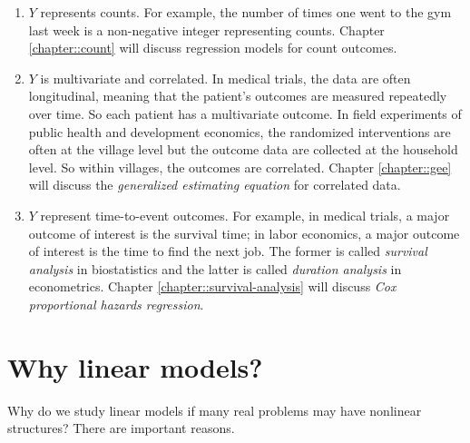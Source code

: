 \begin{enumerate}[label=(T\arabic*), ref=T\arabic*]
\item $Y$ represents counts. For example, the number of times one went to the gym last week is a non-negative integer representing counts. 
Chapter \ref{chapter::count} will discuss regression models for count outcomes. 




\item $Y$ is  multivariate and correlated. In medical trials, the data are often longitudinal, meaning that the patient's outcomes are measured repeatedly over time. So each patient has a multivariate outcome. In field experiments of public health and development economics, the randomized interventions are often at the village level but the outcome data are collected at the household level. So within villages, the outcomes are correlated. 
Chapter \ref{chapter::gee} will discuss the {\it generalized estimating equation} for correlated data. 




\item $Y$ represent time-to-event outcomes. For example, in medical trials, a major outcome of interest is the survival time; in labor economics, a major outcome of interest is the time to find the next job. The former is called {\it survival analysis} in biostatistics and the latter is called {\it duration analysis} in econometrics.
Chapter \ref{chapter::survival-analysis} will discuss {\it Cox proportional hazards regression}. 


\end{enumerate}


\section{Why linear models?}

Why do we study linear models if many real problems may have nonlinear structures? There are important reasons. 



